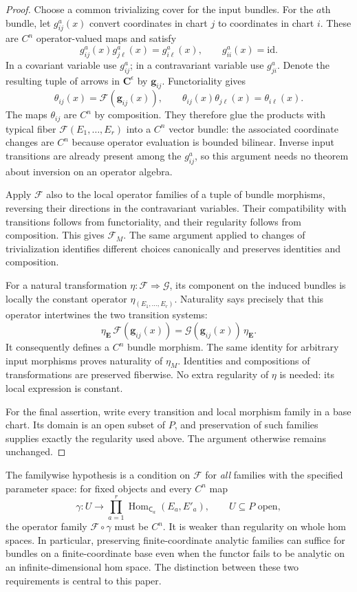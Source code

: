\documentclass[11pt]{amsart}
\theoremstyle{definition}
\theoremstyle{remark}
\numberwithin{equation}{section}
\newcommand{\id}{\mathrm{id}}
\begin{document}
\begin{proof}
Choose a common trivializing cover for the input bundles. For the $a$th bundle, let $g^a_{ij}(x)$ convert coordinates in chart $j$ to coordinates in chart $i$. These are $C^n$ operator-valued maps and satisfy
\[
 g^a_{ij}(x)g^a_{j\ell}(x)=g^a_{i\ell}(x),
 \qquad g^a_{ii}(x)=\id.
\]
In a covariant variable use $g^a_{ij}$; in a contravariant variable use $g^a_{ji}$. Denote the resulting tuple of arrows in $\mathbf C^\epsilon$ by $\mathbf g_{ij}$. Functoriality gives
\[
 \theta_{ij}(x)=\mathcal F(\mathbf g_{ij}(x)),\qquad
 \theta_{ij}(x)\theta_{j\ell}(x)=\theta_{i\ell}(x).
\]
The maps $\theta_{ij}$ are $C^n$ by composition. They therefore glue the products with typical fiber $\mathcal F(E_1,\ldots,E_r)$ into a $C^n$ vector bundle: the associated coordinate changes are $C^n$ because operator evaluation is bounded bilinear. Inverse input transitions are already present among the $g^a_{ij}$, so this argument needs no theorem about inversion on an operator algebra.

Apply $\mathcal F$ also to the local operator families of a tuple of bundle morphisms, reversing their directions in the contravariant variables. Their compatibility with transitions follows from functoriality, and their regularity follows from composition. This gives $\mathcal F_M$. The same argument applied to changes of trivialization identifies different choices canonically and preserves identities and composition.

For a natural transformation $\eta\colon\mathcal F\Rightarrow\mathcal G$, its component on the induced bundles is locally the constant operator $\eta_{(E_1,\ldots,E_r)}$. Naturality says precisely that this operator intertwines the two transition systems:
\[
 \eta_{\mathbf E}\,\mathcal F(\mathbf g_{ij}(x))
 =\mathcal G(\mathbf g_{ij}(x))\,\eta_{\mathbf E}.
\]
It consequently defines a $C^n$ bundle morphism. The same identity for arbitrary input morphisms proves naturality of $\eta_M$. Identities and compositions of transformations are preserved fiberwise. No extra regularity of $\eta$ is needed: its local expression is constant.

For the final assertion, write every transition and local morphism family in a base chart. Its domain is an open subset of $P$, and preservation of such families supplies exactly the regularity used above. The argument otherwise remains unchanged.
\end{proof}

The familywise hypothesis is a condition on $\mathcal F$ for \emph{all} families with the specified parameter space: for fixed objects and every $C^n$ map
\[
 \gamma\colon U\longrightarrow
 \prod_{a=1}^r\operatorname{Hom}_{\mathsf C_a}(E_a,E'_a),
 \qquad U\subseteq P\text{ open},
\]
the operator family $\mathcal F\circ\gamma$ must be $C^n$. It is weaker than regularity on whole hom spaces. In particular, preserving finite-coordinate analytic families can suffice for bundles on a finite-coordinate base even when the functor fails to be analytic on an infinite-dimensional hom space. The distinction between these two requirements is central to this paper.
\end{document}
